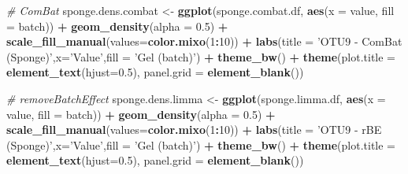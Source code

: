 \documentclass[]{book}
\newenvironment{Shaded}{\begin{snugshade}}{\end{snugshade}}
\newcommand{\KeywordTok}[1]{\textcolor[rgb]{0.13,0.29,0.53}{\textbf{#1}}}
\newcommand{\DataTypeTok}[1]{\textcolor[rgb]{0.13,0.29,0.53}{#1}}
\newcommand{\DecValTok}[1]{\textcolor[rgb]{0.00,0.00,0.81}{#1}}
\newcommand{\FloatTok}[1]{\textcolor[rgb]{0.00,0.00,0.81}{#1}}
\newcommand{\StringTok}[1]{\textcolor[rgb]{0.31,0.60,0.02}{#1}}
\newcommand{\CommentTok}[1]{\textcolor[rgb]{0.56,0.35,0.01}{\textit{#1}}}
\newcommand{\OperatorTok}[1]{\textcolor[rgb]{0.81,0.36,0.00}{\textbf{#1}}}
\newcommand{\NormalTok}[1]{#1}
\begin{document}
\begin{Shaded}
\begin{Highlighting}[]
\CommentTok{# ComBat}
\NormalTok{sponge.dens.combat <-}\StringTok{ }\KeywordTok{ggplot}\NormalTok{(sponge.combat.df, }\KeywordTok{aes}\NormalTok{(}\DataTypeTok{x =}\NormalTok{ value, }\DataTypeTok{fill =}\NormalTok{ batch)) }\OperatorTok{+}\StringTok{ }\KeywordTok{geom_density}\NormalTok{(}\DataTypeTok{alpha =} \FloatTok{0.5}\NormalTok{) }\OperatorTok{+}\StringTok{ }\KeywordTok{scale_fill_manual}\NormalTok{(}\DataTypeTok{values=}\KeywordTok{color.mixo}\NormalTok{(}\DecValTok{1}\OperatorTok{:}\DecValTok{10}\NormalTok{)) }\OperatorTok{+}\StringTok{ }\KeywordTok{labs}\NormalTok{(}\DataTypeTok{title =} \StringTok{'OTU9 - ComBat (Sponge)'}\NormalTok{,}\DataTypeTok{x=}\StringTok{'Value'}\NormalTok{,}\DataTypeTok{fill =} \StringTok{'Gel (batch)'}\NormalTok{) }\OperatorTok{+}\StringTok{ }\KeywordTok{theme_bw}\NormalTok{() }\OperatorTok{+}\StringTok{ }\KeywordTok{theme}\NormalTok{(}\DataTypeTok{plot.title =} \KeywordTok{element_text}\NormalTok{(}\DataTypeTok{hjust=}\FloatTok{0.5}\NormalTok{), }\DataTypeTok{panel.grid =} \KeywordTok{element_blank}\NormalTok{())}


\CommentTok{# removeBatchEffect }
\NormalTok{sponge.dens.limma <-}\StringTok{ }\KeywordTok{ggplot}\NormalTok{(sponge.limma.df, }\KeywordTok{aes}\NormalTok{(}\DataTypeTok{x =}\NormalTok{ value, }\DataTypeTok{fill =}\NormalTok{ batch)) }\OperatorTok{+}\StringTok{ }\KeywordTok{geom_density}\NormalTok{(}\DataTypeTok{alpha =} \FloatTok{0.5}\NormalTok{) }\OperatorTok{+}\StringTok{ }\KeywordTok{scale_fill_manual}\NormalTok{(}\DataTypeTok{values=}\KeywordTok{color.mixo}\NormalTok{(}\DecValTok{1}\OperatorTok{:}\DecValTok{10}\NormalTok{)) }\OperatorTok{+}\StringTok{ }\KeywordTok{labs}\NormalTok{(}\DataTypeTok{title =} \StringTok{'OTU9 - rBE (Sponge)'}\NormalTok{,}\DataTypeTok{x=}\StringTok{'Value'}\NormalTok{,}\DataTypeTok{fill =} \StringTok{'Gel (batch)'}\NormalTok{) }\OperatorTok{+}\StringTok{ }\KeywordTok{theme_bw}\NormalTok{() }\OperatorTok{+}\StringTok{ }\KeywordTok{theme}\NormalTok{(}\DataTypeTok{plot.title =} \KeywordTok{element_text}\NormalTok{(}\DataTypeTok{hjust=}\FloatTok{0.5}\NormalTok{), }\DataTypeTok{panel.grid =} \KeywordTok{element_blank}\NormalTok{())}



\end{Highlighting}
\end{Shaded}
\end{document}

